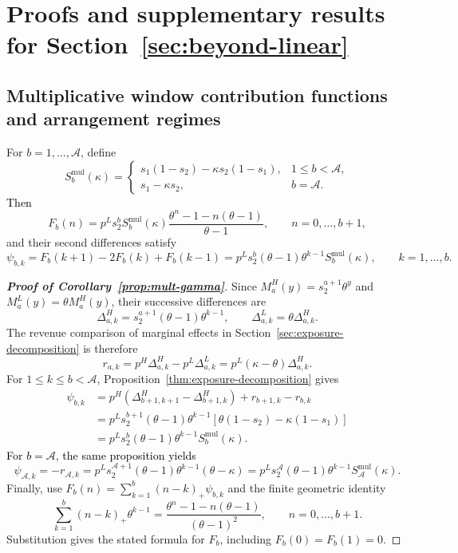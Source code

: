 \section{Proofs and supplementary results for Section~\ref{sec:beyond-linear}}
\label{app:mult-proofs}
\subsection{Multiplicative window contribution functions and arrangement regimes}
\label{app:mult-regimes}
\hypertarget{proof-multiplicative-windows}{}

\begin{corollary}[\textcolor{black}{Formula for \(F_b\)}]
    \label{prop:mult-gamma}
For \(b=1,\ldots,\mathcal A\), define
\[
 S_b^{\mathrm{mul}}(\kappa)=
 \begin{cases}
 s_1(1-s_2)-\kappa s_2(1-s_1),&1\le b<\mathcal A,\\
 s_1-\kappa s_2,&b=\mathcal A.
 \end{cases}
\]
\textcolor{black}{Then}
\[
 F_b(n)=p^Ls_2^bS_b^{\mathrm{mul}}(\kappa)
 \frac{\theta^n-1-n(\theta-1)}{\theta-1},
 \qquad n=0,\ldots,b+1,
\]
and their second differences satisfy
\[
 \psi_{b,k}=F_b(k+1)-2F_b(k)+F_b(k-1)
 =p^Ls_2^b(\theta-1)\theta^{k-1}S_b^{\mathrm{mul}}(\kappa),
 \qquad k=1,\ldots,b.
\]
\end{corollary}

\begin{proof}[\normalfont\bfseries Proof of Corollary~\ref{prop:mult-gamma}]
Since \(M_a^H(y)=s_2^{a+1}\theta^y\) and \(M_a^L(y)=\theta M_a^H(y)\), their successive differences are
\[
 \Delta_{a,k}^H=s_2^{a+1}(\theta-1)\theta^{k-1},\qquad
 \Delta_{a,k}^L=\theta\Delta_{a,k}^H.
\]
The revenue comparison of marginal effects in Section~\ref{sec:exposure-decomposition} is therefore
\[
 r_{a,k}=p^H\Delta_{a,k}^H-p^L\Delta_{a,k}^L
        =p^L(\kappa-\theta)\Delta_{a,k}^H.
\]
For \(1\le k\le b<\mathcal A\), Proposition~\ref{thm:exposure-decomposition} gives
\[
\begin{aligned}
 \psi_{b,k}
 &=p^H(\Delta_{b+1,k+1}^H-\Delta_{b+1,k}^H)+r_{b+1,k}-r_{b,k}\\
 &=p^Ls_2^{b+1}(\theta-1)\theta^{k-1}
       [\theta(1-s_2)-\kappa(1-s_1)]\\
 &=p^Ls_2^b(\theta-1)\theta^{k-1}S_b^{\mathrm{mul}}(\kappa).
\end{aligned}
\]
\textcolor{black}{For \(b=\mathcal A\), the same proposition yields}
\[
 \psi_{\mathcal A,k}=-r_{\mathcal A,k}
 =p^Ls_2^{\mathcal A+1}(\theta-1)\theta^{k-1}(\theta-\kappa)
 =p^Ls_2^{\mathcal A}(\theta-1)\theta^{k-1}S_{\mathcal A}^{\mathrm{mul}}(\kappa).
\]
Finally, use \(F_b(n)=\sum_{k=1}^{b}(n-k)_+\psi_{b,k}\) and the finite geometric identity
\[
 \sum_{k=1}^{b}(n-k)_+\theta^{k-1}
 =\frac{\theta^n-1-n(\theta-1)}{(\theta-1)^2},
 \qquad n=0,\ldots,b+1.
\]
Substitution gives the stated formula for \(F_b\), including \(F_b(0)=F_b(1)=0\).
\end{proof}

